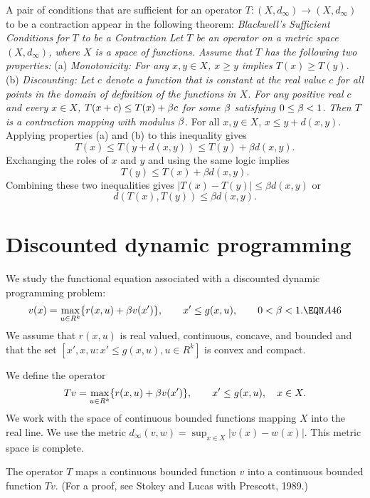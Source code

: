 A pair of conditions that are sufficient for an operator $T:(X,d_\infty)\to
(X,d_\infty)$ to be a contraction appear in the following
theorem:
\medskip
 {\it Blackwell's Sufficient Conditions for $T$ to
be a Contraction}
\medskip
\noindent
{\it Let $T$ be an operator on a metric space $(X,d_\infty)$, where $X$ is a
space of functions.  Assume that $T$ has the following two
properties:}\hfil\break
\noindent(a) {\it Monotonicity:  For any $x,y\in X$, $x\ge y$ implies $T(x) \ge
T(y)$}.\hfil\break
\noindent(b) {\it Discounting:  Let $c$ denote a function that is constant at the
real value $c$ for all points in the domain of definition of the functions in
$X$.  For any positive real $c$ and every $x\in X$, $T(x+c)\le T(x)+{\beta} c$ for
some ${\beta}$
satisfying $0\le {\beta} <1$.}\hfil\break
\noindent
{\it Then $T$ is a contraction mapping with modulus ${\beta}$.}\endtheorem
\medskip
\proof For all $x,y \in X$, $x \leq y + d(x,y)$.  Applying
properties (a) and  (b) to this inequality gives
$$T(x) \leq T(y+d(x,y)) \leq T(y) + \beta d(x,y). $$
Exchanging the roles of $x$ and $y$ and using the same logic
implies
$$ T(y) \leq T(x) + \beta d(x,y). $$
Combining  these two inequalities gives $|T(x) - T(y)| \leq \beta
d(x,y)$ or
$$ d(T(x), T(y)) \leq \beta d(x,y) .$$\endproof %

\medskip

\section{Discounted dynamic programming}

We study the functional equation associated with a discounted dynamic
programming problem:
$$v(x)=\max_{u\in R^k} \{r(x,u)+\be v(x')\},\qquad x'\le g(x,u),\qquad
0<\be<1.  \EQN A46 $$
We assume that $r(x,u)$ is real valued, continuous, concave, and bounded and
that the set $[x',x,u:x'\le g(x,u),u\in R^k]$ is convex and compact.

We define the operator
$$Tv=\mathop{\hbox{max}}_{u\in R^k} \{r(x,u)+{\beta} v(x')\},\qquad x'\le g(x,u),\quad x\in X.$$
We work with the space of continuous bounded functions mapping $X$ into the
real line.  We use the %
 metric
$d_\infty(v,w) =\sup_{x\in X} |v(x)-w(x)|.$
This metric space is complete.

The operator $T$ maps a continuous bounded function $v$ into a continuous
bounded function $Tv$.  (For a proof, see Stokey and Lucas
with Prescott, 1989.)

